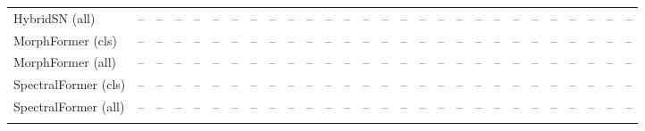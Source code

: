 \begin{longtable}{lrrrrrrrrrrrrrrrrrrrrrrrrrrr}
HybridSN (all) & -- & -- & -- & -- & -- & -- & -- & -- & -- & -- & -- & -- & -- & -- & -- & -- & -- & -- & -- & -- & -- & -- & -- & -- & -- & -- & --\\
\addlinespace
MorphFormer (cls) & -- & -- & -- & -- & -- & -- & -- & -- & -- & -- & -- & -- & -- & -- & -- & -- & -- & -- & -- & -- & -- & -- & -- & -- & -- & -- & --\\*
MorphFormer (all) & -- & -- & -- & -- & -- & -- & -- & -- & -- & -- & -- & -- & -- & -- & -- & -- & -- & -- & -- & -- & -- & -- & -- & -- & -- & -- & --\\
\addlinespace
SpectralFormer (cls) & -- & -- & -- & -- & -- & -- & -- & -- & -- & -- & -- & -- & -- & -- & -- & -- & -- & -- & -- & -- & -- & -- & -- & -- & -- & -- & --\\*
SpectralFormer (all) & -- & -- & -- & -- & -- & -- & -- & -- & -- & -- & -- & -- & -- & -- & -- & -- & -- & -- & -- & -- & -- & -- & -- & -- & -- & -- & --\\
\addlinespace
\end{longtable}
